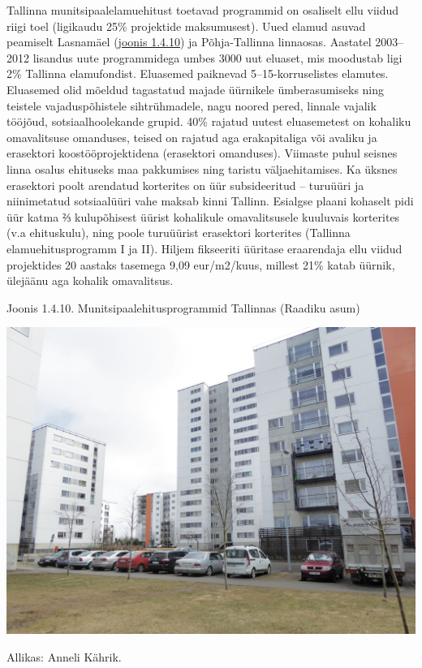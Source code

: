 \documentclass[estonian,]{article}
\begin{document}
Tallinna munitsipaalelamuehitust toetavad programmid on osaliselt ellu viidud riigi toel (ligikaudu 25\% projektide maksumusest). Uued elamud asuvad peamiselt Lasnamäel (\protect\hyperlink{figure1410}{joonis 1.4.10}) ja Põhja-Tallinna linnaosas. Aastatel 2003--2012 lisandus uute programmidega umbes 3000 uut eluaset, mis moodustab ligi 2\% Tallinna elamufondist. Eluasemed paiknevad 5--15-korruselistes elamutes. Eluasemed olid mõeldud tagastatud majade üürnikele ümberasumiseks ning teistele vajaduspõhistele sihtrühmadele, nagu noored pered, linnale vajalik tööjõud, sotsiaalhoolekande grupid. 40\% rajatud uutest eluasemetest on kohaliku omavalitsuse omanduses, teised on rajatud aga erakapitaliga või avaliku ja erasektori koostööprojektidena (erasektori omanduses). Viimaste puhul seisnes linna osalus ehituseks maa pakkumises ning taristu väljaehitamises. Ka üksnes erasektori poolt arendatud korterites on üür subsideeritud -- turuüüri ja niinimetatud sotsiaalüüri vahe maksab kinni Tallinn. Esialgse plaani kohaselt pidi üür katma ⅔ kulupõhisest üürist kohalikule omavalitsusele kuuluvais korterites (v.a ehituskulu), ning poole turuüürist erasektori korterites (Tallinna elamuehitusprogramm I ja II). Hiljem fikseeriti üüritase eraarendaja ellu viidud projektides 20 aastaks tasemega 9,09 eur/m2/kuus, millest 21\% katab üürnik, ülejäänu aga kohalik omavalitsus.

{Joonis 1.4.10.} Munitsipaalehitusprogrammid Tallinnas (Raadiku asum)

\begin{center}\includegraphics[width=0.9\linewidth]{figures/1-chapter/fig1410} \end{center}

\begin{imgsource}
{Allikas:} Anneli Kährik.
\end{imgsource}
\end{document}
